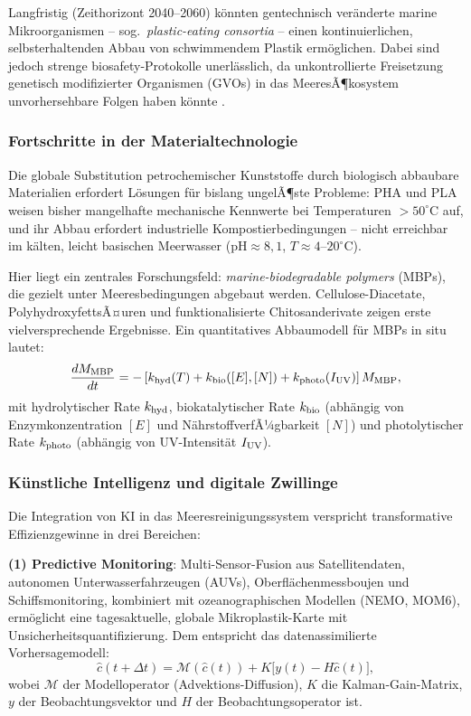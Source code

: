 ﻿\documentclass[12pt,a4paper]{article}
\theoremstyle{definition}
\theoremstyle{remark}
\newcommand{\MP}{Mikroplastik}
\begin{document}
Langfristig (Zeithorizont 2040--2060) k\"onnten gentechnisch ver\"anderte
marine Mikroorganismen -- sog.\ \textit{plastic-eating consortia} --
einen kontinuierlichen, selbsterhaltenden Abbau von
schwimmendem Plastik erm\"oglichen. Dabei sind jedoch strenge
biosafety-Protokolle unerl\"asslich, da unkontrollierte Freisetzung
genetisch modifizierter Organismen (GVOs) in das MeeresÃ¶kosystem
unvorhersehbare Folgen haben k\"onnte \cite{yang2021plastics}.

\subsubsection{Fortschritte in der Materialtechnologie}

Die globale Substitution petrochemischer Kunststoffe durch biologisch
abbaubare Materialien erfordert L\"osungen f\"ur bislang ungelÃ¶ste
Probleme: PHA und PLA weisen bisher mangelhafte mechanische Kennwerte
bei Temperaturen $> 50^\circ$C auf, und ihr Abbau erfordert industrielle
Kompostierbedingungen -- nicht erreichbar im k\"alten, leicht basischen
Meerwasser ($\text{pH} \approx 8{,}1$, $T \approx 4$--$20^\circ$C).

Hier liegt ein zentrales Forschungsfeld: \textit{marine-biodegradable
polymers} (MBPs), die gezielt unter Meeresbedingungen abgebaut werden.
Cellulose-Diacetate, PolyhydroxyfettsÃ¤uren und funktionalisierte
Chitosanderivate zeigen erste vielversprechende Ergebnisse. Ein quantitatives Abbaumodell f\"ur MBPs
in situ lautet:
\begin{equation}
  \frac{dM_{\rm MBP}}{dt} = -\left[k_{\rm hyd}(T) + k_{\rm bio}([E], [N])
  + k_{\rm photo}(I_{\rm UV})\right] M_{\rm MBP},
\end{equation}
mit hydrolytischer Rate $k_{\rm hyd}$, biokatalytischer Rate $k_{\rm bio}$
(abh\"angig von Enzymkonzentration $[E]$ und N\"ahrstoffverfÃ¼gbarkeit $[N]$)
und photolytischer Rate $k_{\rm photo}$ (abh\"angig von UV-Intensit\"at $I_{\rm UV}$).

\subsubsection{K\"unstliche Intelligenz und digitale Zwillinge}

Die Integration von KI in das Meeresreinigungssystem verspricht
transformative Effizienzgewinne in drei Bereichen:

\textbf{(1) Predictive Monitoring}: Multi-Sensor-Fusion aus Satellitendaten,
autonomen Unterwasserfahrzeugen (AUVs), Oberfl\"achenmessboujen und
Schiffsmonitoring, kombiniert mit ozeanographischen Modellen (NEMO, MOM6),
erm\"oglicht eine tagesaktuelle, globale \MP{}-Karte mit Unsicherheitsquantifizierung.
Dem entspricht das datenassimilierte Vorhersagemodell:
\begin{equation}
  \hat{c}(t+\Delta t) = \mathcal{M}(\hat{c}(t)) + K\bigl[y(t) - H\hat{c}(t)\bigr],
\end{equation}
wobei $\mathcal{M}$ der Modelloperator (Advektions-Diffusion), $K$ die
Kalman-Gain-Matrix, $y$ der Beobachtungsvektor und $H$ der Beobachtungsoperator ist.
\end{document}
